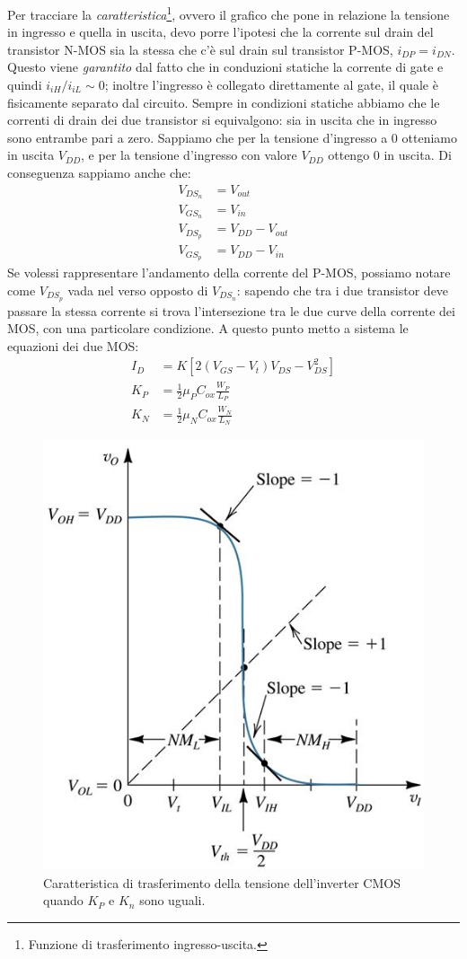 \documentclass[
]{book}
\begin{document}
Per tracciare la \emph{caratteristica}\footnote{Funzione di
  trasferimento ingresso-uscita.}, ovvero il grafico che pone in
relazione la tensione in ingresso e quella in uscita, devo porre
l'ipotesi che la corrente sul drain del transistor N-MOS sia la stessa
che c'è sul drain sul transistor P-MOS, \(i_{DP}=i_{DN}\). Questo viene
\emph{garantito} dal fatto che in conduzioni statiche la corrente di
gate e quindi \(i_{iH}/i_{iL}\sim 0\); inoltre l'ingresso è collegato
direttamente al gate, il quale è fisicamente separato dal circuito.
Sempre in condizioni statiche abbiamo che le correnti di drain dei due
transistor si equivalgono: sia in uscita che in ingresso sono entrambe
pari a zero. \newline Sappiamo che per la tensione d'ingresso a 0
otteniamo in uscita \(V_{DD}\), e per la tensione d'ingresso con valore
\(V_{DD}\) ottengo 0 in uscita. Di conseguenza sappiamo anche che:
\begin{align*}
V_{DS_{n}}&=V_{out}\\
V_{GS_{n}}&=V_{in}\\
V_{DS_{p}}&= V_{DD}-V_{out}\\
V_{GS_{p}}&=V_{DD}-V_{in}
\end{align*} Se volessi rappresentare l'andamento della corrente del
P-MOS, possiamo notare come \(V_{DS_{p}}\) vada nel verso opposto di
\(V_{DS_{n}}\): sapendo che tra i due transistor deve passare la stessa
corrente si trova l'intersezione tra le due curve della corrente dei
MOS, con una particolare condizione. A questo punto metto a sistema le
equazioni dei due MOS: \begin{align*}
I_D&=K[2(V_{GS}-V_t)V_{DS}-V_{DS}^2] \\
K_{P}&=\frac{1}{2}\mu_{P}C_{ox}\frac{W_{P}}{L_{P}}\\
K_{N}&=\frac{1}{2}\mu_{N}C_{ox}\frac{W_{N}}{L_{N}}
\end{align*}

\begin{figure}
\centering
\includegraphics[width=0.45\linewidth,height=\textheight,keepaspectratio]{assets/imgs/curva_cmos_not_tensione.png}
\caption{Caratteristica di trasferimento della tensione dell'inverter
CMOS quando \(K_{P}\) e \(K_{n}\) sono uguali.}
\end{figure}
\end{document}
